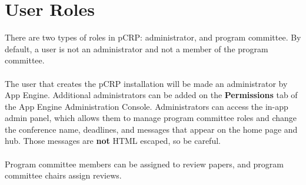 \documentclass[12pt]{article}
\begin{document}
\section{User Roles}
	There are two types of roles in pCRP: administrator, and program
	committee. By default, a user is not an administrator and not a member
	of the program committee.
	\\\\
	The user that creates the pCRP installation will be made an
	administrator by App Engine. Additional administrators can be added
	on the \textbf{Permissions} tab of the App Engine Administration Console.
	Administrators can access the in-app admin panel, which allows them to
	manage program committee roles and change the conference name, deadlines,
	and messages that appear on the home page and hub. Those messages are
	\textbf{not} HTML escaped, so be careful.
	\\\\
	Program committee members can be assigned to review papers, and program
	committee chairs assign reviews.



\end{document}
